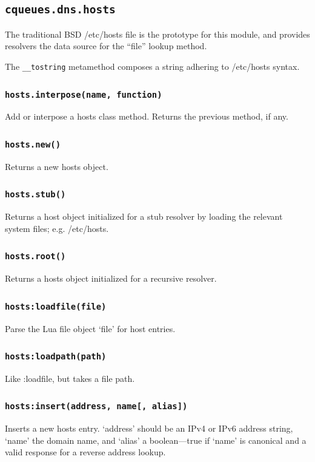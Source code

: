 \documentclass[11pt, oneside]{memoir}
\newcommand*{\fn}[1]{\texttt{#1}\xspace}
\newcounter{toccols}
\newenvironment{Module}[1]{
	\subsection{\texttt{#1}}
	\addtocontents{toc}{
		\protect\begin{multicols}{\value{toccols}}
	}
}{
	\addtocontents{toc}{\protect\end{multicols}}
}
\begin{document}
\begin{Module}{cqueues.dns.hosts}

The traditional BSD /etc/hosts file is the prototype for this module, and provides resolvers the data source for the ``file'' lookup method.

The \fn{\_\_tostring} metamethod composes a string adhering to /etc/hosts syntax.

\subsubsection[\fn{hosts.interpose}]{\fn{hosts.interpose(name, function)}}

Add or interpose a hosts class method. Returns the previous method, if any.

\subsubsection[\fn{hosts.new}]{\fn{hosts.new()}}

Returns a new hosts object.

\subsubsection[\fn{hosts.stub}]{\fn{hosts.stub()}}

Returns a host object initialized for a stub resolver by loading the relevant system files; e.g. /etc/hosts.

\subsubsection[\fn{hosts.root}]{\fn{hosts.root()}}

Returns a hosts object initialized for a recursive resolver.

\subsubsection[\fn{hosts:loadfile}]{\fn{hosts:loadfile(file)}}

Parse the Lua file object `file' for host entries.

\subsubsection[\fn{hosts:loadpath}]{\fn{hosts:loadpath(path)}}

Like :loadfile, but takes a file path.

\subsubsection[\fn{hosts:insert}]{\fn{hosts:insert(address, name[, alias])}}

Inserts a new hosts entry. `address' should be an IPv4 or IPv6 address string, `name' the domain name, and `alias' a boolean---true if `name' is canonical and a valid response for a reverse address lookup.

\end{Module}
\end{document}
